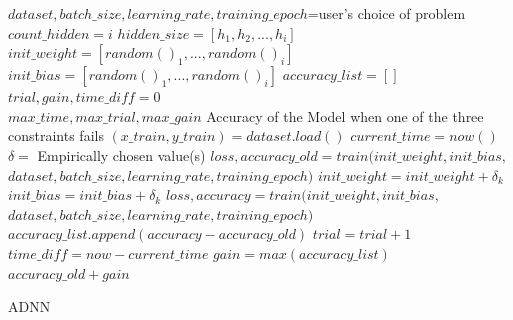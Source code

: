 \begin{algorithm}
	\footnotesize
	\begin{algorithmic}[1]
		\State $dataset,batch\_size, learning\_rate, training\_epoch$=user's choice of problem
		\State $count\_hidden=i$
		\State $hidden\_size=[h_1,h_2,...,h_i]$
		\State $init\_weight=[random()_1,...,random()_i]$
		\State $init\_bias=[random()_1,...,random()_i]$
		\State $accuracy\_list=[]$
		\State $trial,gain,time\_diff=0$\\
		\algorithmicrequire $max\_time, max\_trial, max\_gain$ \newline 
		\algorithmicensure Accuracy of the Model when one of the three constraints fails
		\State	$(x\_train, y\_train)=dataset.load()$
		\State $current\_time=now()$
		\State $\delta=$ Empirically chosen value(s)
		\State $loss, accuracy\_old=train(init\_weight,init\_bias,$
					$dataset,batch\_size, learning\_rate, training\_epoch)$
		\State $init\_weight=init\_weight+\delta_k$
		\State $init\_bias=init\_bias+\delta_k$
		\State $loss, accuracy=train(init\_weight,init\_bias,$
		$dataset,batch\_size, learning\_rate, training\_epoch)$
		\State $accuracy\_list.append(accuracy-accuracy\_old)$
		\State $trial=trial+1$
		\State $time\_diff=now-current\_time$
		\State $gain=max(accuracy\_list)$
		\EndWhile
		\EndFor
		\State \Return $accuracy\_old+gain$
		\EndProcedure
	\end{algorithmic} 
	\caption{\footnotesize ADNN}
	\label{algo:adnn}
\end{algorithm}
